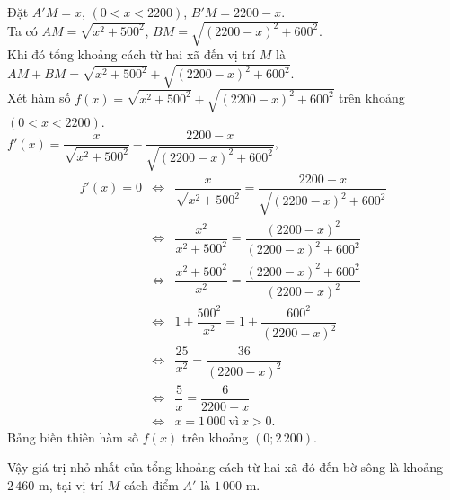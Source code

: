 \begin{bt}
{\begin{center}
		\end{center}
		Đặt $A'M=x$, $(0<x<2200)$,  $B'M=2200-x$.\\
		Ta có  $AM=\sqrt{x^2+500^2}$, $BM=\sqrt{(2200-x)^2+600^2}$.\\
		Khi đó tổng khoảng cách từ hai xã đến vị trí $M$ là $AM+BM= \sqrt{x^2+500^2}+\sqrt{(2200-x)^2+600^2} $.\\
		Xét hàm số $f(x)= \sqrt{x^2+500^2}+\sqrt{(2200-x)^2+600^2}$ trên khoảng $(0<x<2200)$.\\
		$f'(x)=\dfrac{x}{\sqrt{x^2+500^2}}-\dfrac{2200-x}{\sqrt{(2200-x)^2+600^2}}$,
		\allowdisplaybreaks
		\begin{eqnarray*}
			f'(x)=0&\Leftrightarrow&\dfrac{x}{\sqrt{x^2+500^2}}=\dfrac{2200-x}{\sqrt{(2200-x)^2+600^2}}
			\\
			&\Leftrightarrow&\dfrac{x^2}{x^2+500^2}=\dfrac{(2200-x)^2}{(2200-x)^2+600^2}\\
			&\Leftrightarrow&\dfrac{x^2+500^2}{x^2}=\dfrac{(2200-x)^2+600^2}{(2200-x)^2}\\
			&\Leftrightarrow& 1+\dfrac{500^2}{x^2}=1+\dfrac{600^2}{(2200-x)^2}
			\\
			&\Leftrightarrow& \dfrac{25}{x^2}=\dfrac{36}{(2200-x)^2}
			\\
			&\Leftrightarrow& \dfrac{5}{x}=\dfrac{6}{2200-x}
			\\
			&\Leftrightarrow& x=1\,000~ \text{vì}~  x>0.			
		\end{eqnarray*} 
		Bảng biến thiên hàm số $f(x)$ trên khoảng $( 0;2\,200)$.
		\begin{center}
		\end{center}
		Vậy giá trị nhỏ nhất của tổng khoảng cách từ hai xã đó đến bờ sông  là khoảng $2\,460$  m, tại vị trí $M$ cách điểm $A'$  là $1\,000$  m.
	}
\end{bt}

